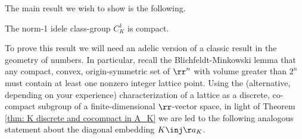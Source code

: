 \documentclass[11pt, x11names, openany]{book}
\begin{document}
The main result we wish to show is the following.

\begin{theorem}
    \label{thm: C^1_K is compact}
The norm-1 idele class-group $C^1_K$ is compact.
\end{theorem}

To prove this result we will need an adelic version of a classic result in the geometry of numbers. In particular, recall the Blichfeldt-Minkowski lemma that any compact, convex, origin-symmetric set of $\rr^n$ with volume greater than $2^n$ must contain at least one nonzero integer lattice point.
Using the (alternative, depending on your experience) characterization of a lattice as a discrete, co-compact subgroup of a finite-dimensional $\rr$-vector space, in light of Theorem \ref{thm: K discrete and cocompact in A_K} we are led to the following analogous statement about the diagonal embedding $K \inj \aa_K$. 
\end{document}
